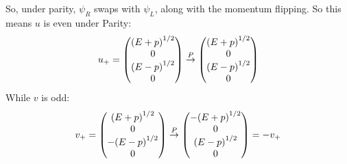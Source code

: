 So, under parity, $\psi_R$ swaps with $\psi_L$, along with the momentum flipping. So this means $u$ is even under Parity:
\begin{align*}
  u_+=\pmqty{{(E+p)}^{1/2}\\0\\{(E-p)}^{1/2}\\0}
  \overset{P}{\rightarrow}\pmqty{{(E+p)}^{1/2}\\0\\{(E-p)}^{1/2}\\0}
\end{align*}
While $v$ is odd:
\begin{align*}
  v_+=\pmqty{{(E+p)}^{1/2}\\0\\-{(E-p)}^{1/2}\\0}
  \overset{P}{\rightarrow}\pmqty{-{(E+p)}^{1/2}\\0\\{(E-p)}^{1/2}\\0}=-v_+
\end{align*}
